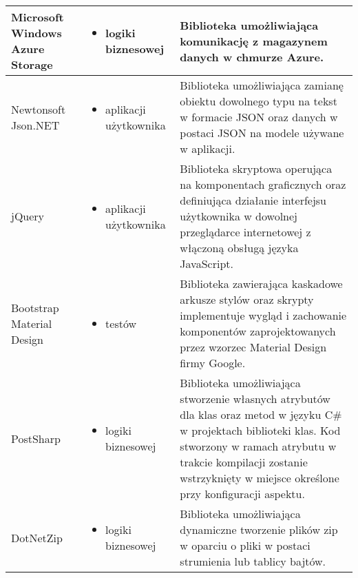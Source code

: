 \begin{center}
\begin{longtable}{ | p{2.2cm} | p{5cm} | p{6.5cm} |}
    \hline Microsoft Windows Azure Storage &  
    \begin{itemize} 
    	\item logiki biznesowej
    \end{itemize} 
    & Biblioteka umożliwiająca komunikację z magazynem danych w chmurze Azure.\\ \hline
    
        \hline Newtonsoft Json.NET  &
        \begin{itemize} 
   			 \item aplikacji użytkownika
   		 \end{itemize}
    & Biblioteka umożliwiająca zamianę obiektu dowolnego typu  na tekst w formacie JSON oraz danych w postaci JSON na modele używane w aplikacji.		\\ \hline
    
    \hline jQuery &  
    \begin{itemize} 
    	\item aplikacji użytkownika
    \end{itemize} 
    & Biblioteka skryptowa operująca na komponentach graficznych oraz definiująca działanie interfejsu użytkownika w dowolnej przeglądarce internetowej z włączoną obsługą języka JavaScript. \\ \hline
    
    
    \hline Bootstrap Material Design &  
    \begin{itemize} 
    	\item testów
    \end{itemize} 
    & Biblioteka zawierająca kaskadowe arkusze stylów oraz skrypty implementuje wygląd i zachowanie komponentów zaprojektowanych przez wzorzec Material Design firmy Google. \\ \hline
    
    
    \hline PostSharp &  
    \begin{itemize} 
    	\item logiki biznesowej
    \end{itemize} 
    & Biblioteka umożliwiająca stworzenie własnych atrybutów dla klas oraz metod w języku C\# w projektach biblioteki klas. Kod stworzony w ramach atrybutu w trakcie kompilacji zostanie wstrzyknięty w miejsce określone przy konfiguracji aspektu. \\ \hline
    
      \hline DotNetZip &  
    \begin{itemize} 
    	\item logiki biznesowej
    \end{itemize} 
    & Biblioteka umożliwiająca dynamiczne tworzenie plików zip w oparciu o pliki w postaci strumienia lub tablicy bajtów. \\ \hline
    

\end{longtable}
\end{center}
